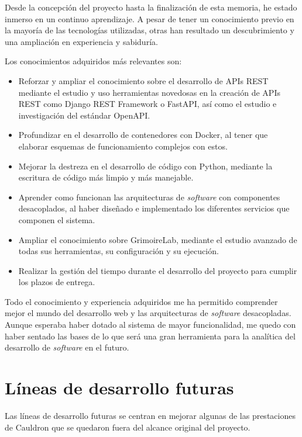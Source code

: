 Desde la concepción del proyecto hasta la finalización de esta memoria, he estado inmerso en un continuo aprendizaje. A pesar de tener un conocimiento previo en la mayoría de las tecnologías utilizadas, otras han resultado un descubrimiento y una ampliación en experiencia y sabiduría.

Los conocimientos adquiridos más relevantes son:

\begin{itemize}
    \item Reforzar y ampliar el conocimiento sobre el desarrollo de APIs REST mediante el estudio y uso herramientas novedosas en la creación de APIs REST como Django REST Framework o FastAPI, así como el estudio e investigación del estándar OpenAPI.
    \item Profundizar en el desarrollo de contenedores con Docker, al tener que elaborar esquemas de funcionamiento complejos con estos.
    \item Mejorar la destreza en el desarrollo de código con Python, mediante la escritura de código más limpio y más manejable.
    \item Aprender como funcionan las arquitecturas de \emph{software} con componentes desacoplados, al haber diseñado e implementado los diferentes servicios que componen el sistema.
    \item Ampliar el conocimiento sobre GrimoireLab, mediante el estudio avanzado de todas sus herramientas, su configuración y su ejecución.
    \item Realizar la gestión del tiempo durante el desarrollo del proyecto para cumplir los plazos de entrega.
\end{itemize}

Todo el conocimiento y experiencia adquiridos me ha permitido comprender mejor el mundo del desarrollo web y las arquitecturas de \emph{software} desacopladas. Aunque esperaba haber dotado al sistema de mayor funcionalidad, me quedo con haber sentado las bases de lo que será una gran herramienta para la analítica del desarrollo de \emph{software} en el futuro.


\section{Líneas de desarrollo futuras}

Las líneas de desarrollo futuras se centran en mejorar algunas de las prestaciones de Cauldron que se quedaron fuera del alcance original del proyecto.

